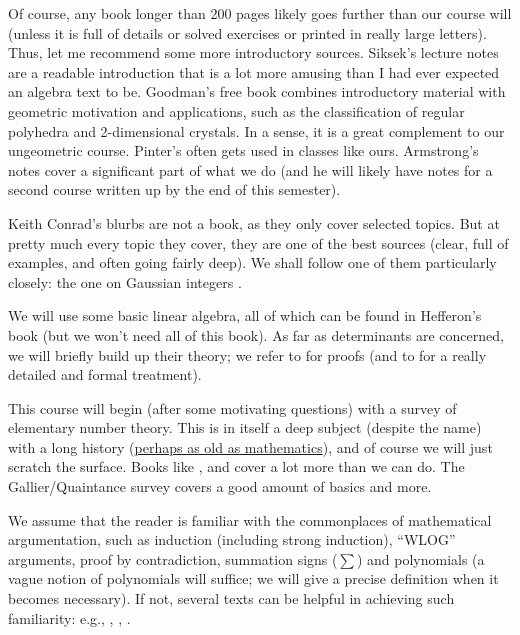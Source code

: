\documentclass[numbers=enddot,12pt,final,onecolumn,notitlepage]{scrartcl}%
\newcounter{exer}
\numberwithin{exer}{section}
\theoremstyle{definition}
\let\sumnonlimits\sum
\renewcommand{\sum}{\sumnonlimits\limits}
\begin{document}
Of course, any book longer than 200 pages likely goes further than
our course will (unless it is full of details or solved exercises or
printed in really large letters).
Thus, let me recommend some more introductory sources.
Siksek's lecture notes \cite{Siksek} are a readable introduction
that is a lot more amusing than I had ever expected an algebra
text to be.
Goodman's free book \cite{Goodman} combines introductory material
with geometric motivation and applications, such as the classification
of regular polyhedra and 2-dimensional crystals.
In a sense, it is a great complement to our ungeometric course.
Pinter's \cite{Pinter} often gets used in classes like ours.
Armstrong's notes \cite{Armstrong} cover a significant part of
what we do (and he will likely have notes for a second course
written up by the end of this semester).

Keith Conrad's blurbs \cite{Conrad*} are not a book, as they only
cover selected topics. But at pretty much every topic they cover,
they are one of the best sources (clear, full of examples, and
often going fairly deep).
We shall follow one of them particularly closely: the one on
Gaussian integers \cite{Conrad-Gauss}.

We will use some basic linear algebra, all of which can be found
in Hefferon's book \cite{Hefferon} (but we won't need all of this
book).
As far as determinants are concerned, we will briefly build up
their theory; we refer to \cite[Section 12 \& Appendix B]{Strickland}
for proofs (and to \cite[Chapter 6]{detnotes} for a really
detailed and formal treatment).

This course will begin (after some motivating questions) with a
survey of elementary number theory.
This is in itself a deep subject (despite the name) with a long
history
(\href{https://en.wikipedia.org/wiki/Plimpton_322}{perhaps as old as mathematics}),
and of course we will just scratch the surface.
Books like \cite{NiZuMo91}, \cite{Burton} and \cite{Uspensky-Heaslet}
cover a lot more than we can do.
The Gallier/Quaintance survey \cite{Gallier-RSA} covers a good
amount of basics and more.

We assume that the reader is familiar with the commonplaces of
mathematical argumentation, such as induction (including strong
induction), ``WLOG'' arguments, proof by contradiction,
summation signs ($\sum$) and polynomials (a vague notion of
polynomials will suffice; we will give a precise definition when
it becomes necessary).
If not, several texts can be helpful in achieving such
familiarity: e.g., \cite[particularly Chapters 1--5]{LeLeMe},
\cite{Hammack}, \cite{Day}.
\end{document}
